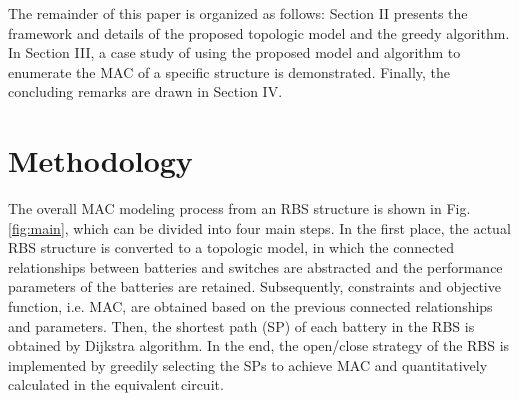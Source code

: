 \documentclass{article}
\begin{document}
The remainder of this paper is organized as follows:
Section II presents the framework and details of the proposed topologic model and the greedy algorithm.
In Section III, a case study of using the proposed model and algorithm to enumerate the MAC of a specific structure is demonstrated.
Finally, the concluding remarks are drawn in Section IV.


\section{Methodology}

The overall MAC modeling process from an RBS structure is shown in Fig. \ref{fig:main}, which can be divided into four main steps.
In the first place, the actual RBS structure is converted to a topologic model, in which the connected relationships between batteries and switches are abstracted and the performance parameters of the batteries are retained.
Subsequently, constraints and objective function, i.e. MAC, are obtained based on the previous connected relationships and parameters.
Then, the shortest path (SP) of each battery in the RBS is obtained by Dijkstra algorithm.
In the end, the open/close strategy of the RBS is implemented by greedily selecting the SPs to achieve MAC and quantitatively calculated in the equivalent circuit.
\end{document}
